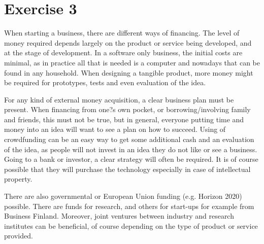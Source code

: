 \documentclass[english,12pt,a4paper,pdftex,elec,utf8]{aaltothesis}
\begin{document}
	


\newpage


\section*{Exercise 3}

	When starting a business, there are different ways of financing. The level of money required depends largely on the product or service being developed, and at the stage of development. In a software only business, the initial costs are minimal, as in practice all that is needed is a computer and nowadays that can be found in any household. When designing a tangible product, more money might be required for prototypes, tests and even evaluation of the idea. 

	For any kind of external money acquisition, a clear business plan must be present. When financing from one?s own pocket, or borrowing/involving family and friends, this must not be true, but in general, everyone putting time and money into an idea will want to see a plan on how to succeed. Using of crowdfunding can be an easy way to get some additional cash and an evaluation of the idea, as people will not invest in an idea they do not like or see a business. Going to a bank or investor, a clear strategy will often be required. It is of course possible that they will purchase the technology especially in case of intellectual property. 

	There are also governmental or European Union funding (e.g. Horizon 2020) possible. There are funds for research, and others for start-ups for example from Business Finland. Moreover, joint ventures between industry and research institutes can be beneficial, of course depending on the type of product or service provided. 
\end{document}
